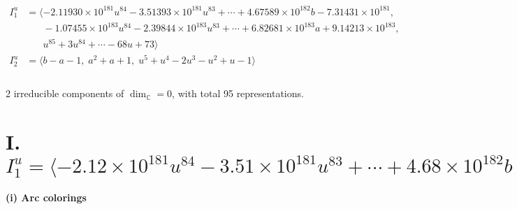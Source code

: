 \documentclass[1p]{elsarticle_modified}
\theoremstyle{definition}
\begin{document}
\begin{align*}
I^u_{1}&=\langle 
-2.11930\times10^{181} u^{84}-3.51393\times10^{181} u^{83}+\cdots+4.67589\times10^{182} b-7.31431\times10^{181},\\
\phantom{I^u_{1}}&\phantom{= \langle  }-1.07455\times10^{183} u^{84}-2.39844\times10^{183} u^{83}+\cdots+6.82681\times10^{183} a+9.14213\times10^{183},\\
\phantom{I^u_{1}}&\phantom{= \langle  }u^{85}+3 u^{84}+\cdots-68 u+73\rangle \\
I^u_{2}&=\langle 
b- a-1,\;a^2+a+1,\;u^5+u^4-2 u^3- u^2+u-1\rangle \\
\\
\end{align*}
\raggedright * 2 irreducible components of $\dim_{\mathbb{C}}=0$, with total 95 representations.\\
\newpage
\renewcommand{\arraystretch}{1}
\centering \section*{I. $I^u_{1}= \langle -2.12\times10^{181} u^{84}-3.51\times10^{181} u^{83}+\cdots+4.68\times10^{182} b-7.31\times10^{181},\;-1.07\times10^{183} u^{84}-2.40\times10^{183} u^{83}+\cdots+6.83\times10^{183} a+9.14\times10^{183},\;u^{85}+3 u^{84}+\cdots-68 u+73 \rangle$}
\flushleft \textbf{(i) Arc colorings}\\
\end{document}
